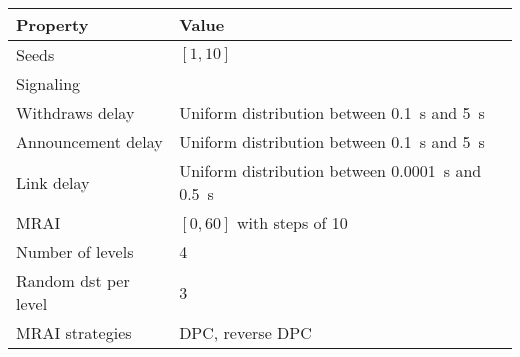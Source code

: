 \begin{center}
	\begin{tabular}{ || m{4cm}| m{8cm} || } 
	\hline
	Property & Value \\ 
	\hline \hline
	Seeds & $[1, 10]$ \\ 
	\hline
	Signaling & \q{AWAWAWAW} \\
	\hline
		Withdraws delay & Uniform distribution between \SI{0.1}{\second} and \SI{5}{\second} \\ 
	\hline
	Announcement delay & Uniform distribution between \SI{0.1}{\second} and \SI{5}{\second} \\ 
	\hline
	Link delay & Uniform distribution between \SI{0.0001}{\second} and \SI{0.5}{\second} \\
	\hline
		MRAI & $[0, 60]$ with steps of \num{10} \\
	\hline
		Number of levels & \num{4} \\
	\hline
		Random dst per level & \num{3} \\
	\hline
		\ac{MRAI} strategies & \ac{DPC}, reverse \ac{DPC} \\
	\hline
	\end{tabular}
\end{center}
